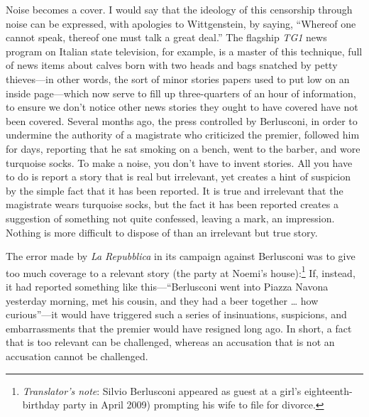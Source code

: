 \documentclass[11pt,twocolumn]{article}
\begin{document}
Noise becomes a cover. I would say that the ideology of this
censorship through noise can be expressed, with apologies to
Wittgenstein, by saying, ``Whereof one cannot speak, thereof one
must talk a great deal.'' The flagship \emph{TG1} news program on
Italian state television, for example, is a master of this technique,
full of news items about calves born with two heads and bags snatched
by petty thieves---in other words, the sort of minor stories papers
used to put low on an inside page---which now serve to fill up
three-quarters of an hour of information, to ensure we don't notice
other news stories they ought to have covered have not been covered.
Several months ago, the press controlled by Berlusconi, in order
to undermine the authority of a magistrate who criticized the
premier, followed him for days, reporting that he sat smoking on a
bench, went to the barber, and wore turquoise socks. To make a
noise, you don't have to invent stories. All you have to do is
report a story that is real but irrelevant, yet creates a hint of
suspicion by the simple fact that it has been reported. It is true
and irrelevant that the magistrate wears turquoise socks, but the
fact it has been reported creates a suggestion of something not
quite confessed, leaving a mark, an impression. Nothing is more
difficult to dispose of than an irrelevant but true story.

The error made by \emph{La Repubblica} in its campaign against Berlusconi
was to give too much coverage to a relevant story (the party at
Noemi's house):\footnote{
\emph{Translator's note}: Silvio Berlusconi appeared as
guest at a girl's eighteenth-birthday party in April 2009)
prompting his wife to file for divorce.}
If, instead, it had reported something like this---``Berlusconi went
into Piazza Navona yesterday morning, met his cousin, and they had
a beer together \ldots\xspace how curious''---it would have triggered such a
series of insinuations, suspicions, and embarrassments that the
premier would have resigned long ago. In short, a fact that is too
relevant can be challenged, whereas an accusation that is not an
accusation cannot be challenged.
\end{document}
